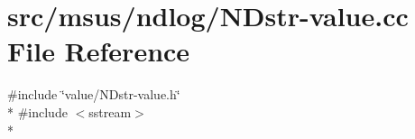 \hypertarget{_n_dstr-value_8cc}{\section{src/msus/ndlog/\-N\-Dstr-\/value.cc File Reference}
\label{_n_dstr-value_8cc}
}
{\ttfamily \#include \char`\"{}value/\-N\-Dstr-\/value.\-h\char`\"{}}\\*
{\ttfamily \#include $<$sstream$>$}\\*
